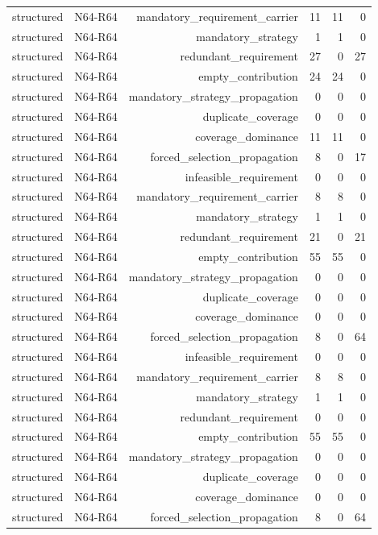 {\begin{longtable}{lrrrrr}
structured & N64-R64 & mandatory\_requirement\_carrier & 11 & 11 & 0 \\
structured & N64-R64 & mandatory\_strategy & 1 & 1 & 0 \\
structured & N64-R64 & redundant\_requirement & 27 & 0 & 27 \\
structured & N64-R64 & empty\_contribution & 24 & 24 & 0 \\
structured & N64-R64 & mandatory\_strategy\_propagation & 0 & 0 & 0 \\
structured & N64-R64 & duplicate\_coverage & 0 & 0 & 0 \\
structured & N64-R64 & coverage\_dominance & 11 & 11 & 0 \\
structured & N64-R64 & forced\_selection\_propagation & 8 & 0 & 17 \\
structured & N64-R64 & infeasible\_requirement & 0 & 0 & 0 \\
structured & N64-R64 & mandatory\_requirement\_carrier & 8 & 8 & 0 \\
structured & N64-R64 & mandatory\_strategy & 1 & 1 & 0 \\
structured & N64-R64 & redundant\_requirement & 21 & 0 & 21 \\
structured & N64-R64 & empty\_contribution & 55 & 55 & 0 \\
structured & N64-R64 & mandatory\_strategy\_propagation & 0 & 0 & 0 \\
structured & N64-R64 & duplicate\_coverage & 0 & 0 & 0 \\
structured & N64-R64 & coverage\_dominance & 0 & 0 & 0 \\
structured & N64-R64 & forced\_selection\_propagation & 8 & 0 & 64 \\
structured & N64-R64 & infeasible\_requirement & 0 & 0 & 0 \\
structured & N64-R64 & mandatory\_requirement\_carrier & 8 & 8 & 0 \\
structured & N64-R64 & mandatory\_strategy & 1 & 1 & 0 \\
structured & N64-R64 & redundant\_requirement & 0 & 0 & 0 \\
structured & N64-R64 & empty\_contribution & 55 & 55 & 0 \\
structured & N64-R64 & mandatory\_strategy\_propagation & 0 & 0 & 0 \\
structured & N64-R64 & duplicate\_coverage & 0 & 0 & 0 \\
structured & N64-R64 & coverage\_dominance & 0 & 0 & 0 \\
structured & N64-R64 & forced\_selection\_propagation & 8 & 0 & 64 \\

\end{longtable}}
